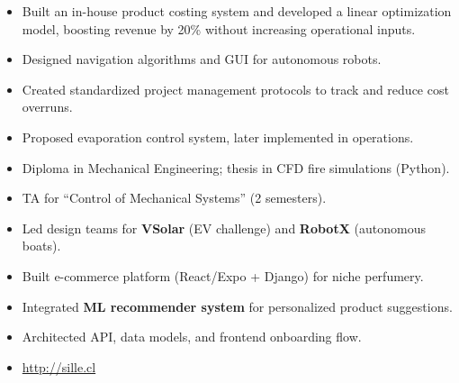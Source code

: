 \documentclass[10pt,a4paper]{altacv} %
\begin{document}
\begin{paracol}{2}
\begin{itemize}
\item Built an in-house product costing system and developed a linear optimization model, boosting revenue by 20\% without increasing operational inputs.
\end{itemize}
\divider

\begin{itemize}
\item Designed navigation algorithms and GUI for autonomous robots.
\end{itemize}
\divider

\begin{itemize}
\item Created standardized project management protocols to track and reduce cost overruns.
\item Proposed evaporation control system, later implemented in operations.
\end{itemize}

\switchcolumn


\begin{itemize}
\item Diploma in Mechanical Engineering; thesis in CFD fire simulations (Python).
\item TA for “Control of Mechanical Systems” (2 semesters).
\item Led design teams for \textbf{VSolar} (EV challenge) and \textbf{RobotX} (autonomous boats).
\end{itemize}


\begin{itemize}
\item Built e-commerce platform (React/Expo + Django) for niche perfumery.
\item Integrated \textbf{ML recommender system} for personalized product suggestions.
\item Architected API, data models, and frontend onboarding flow.
\item \faGlobe\hspace{0.5em} \href{https://sille.cl}{http://sille.cl}
\end{itemize}
\divider


\end{paracol}
\end{document}
